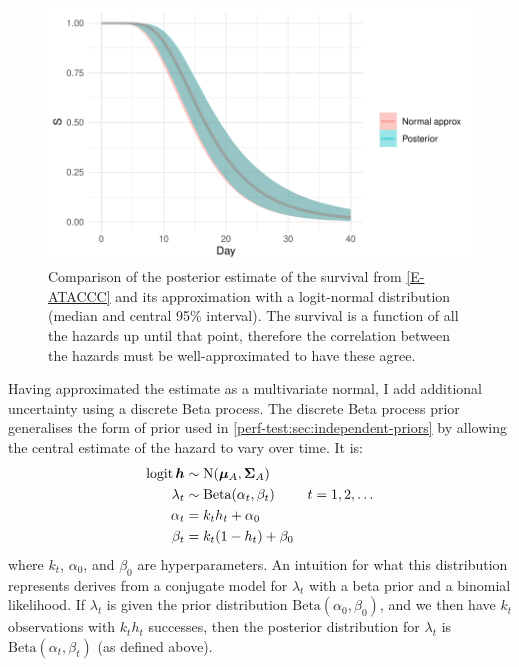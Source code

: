 \documentclass[thesis.tex]{subfiles}
\begin{document}
\begin{figure}
  \centering \includegraphics{cis-perfect-testing/ataccc-approximation-survival}
  \caption[Approximating the ATACCC posterior survival]{Comparison of the posterior estimate of the survival from \cref{E-ATACCC} and its approximation with a logit-normal distribution (median and central 95\% interval). The survival is a function of all the hazards up until that point, therefore the correlation between the hazards must be well-approximated to have these agree. \label{perf-test:fig:approximate-ATACCC-survival}}
\end{figure}

Having approximated the estimate as a multivariate normal, I add additional uncertainty using a discrete Beta process.
The discrete Beta process prior~\autocite{ibrahimBayesian,sunStatisticala} generalises the form of prior used in \cref{perf-test:sec:independent-priors} by allowing the central estimate of the hazard to vary over time.
It is:
\begin{align}
  \operatorname{logit} \bm{h} &\sim \operatorname{N}(\bm{\mu}_A, \bm{\Sigma}_A) \\
  \lambda_t &\sim \text{Beta}(\alpha_t, \beta_t) &t = 1, 2, \dots \\
  \alpha_t &= k_t h_t + \alpha_0 \\
  \beta_t &= k_t (1 - h_t) + \beta_0
\end{align}
where $k_t$, $\alpha_0$, and $\beta_0$ are hyperparameters.
An intuition for what this distribution represents derives from a conjugate model for $\lambda_t$ with a beta prior and a binomial likelihood.
If $\lambda_t$ is given the prior distribution $\text{Beta}(\alpha_0, \beta_0)$, and we then have $k_t$ observations with $k_t h_t$ successes, then the posterior distribution for $\lambda_t$ is $\text{Beta}(\alpha_t, \beta_t)$ (as defined above).
\end{document}
